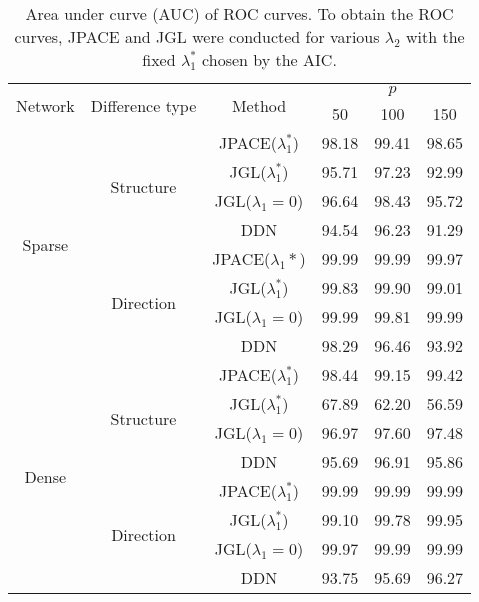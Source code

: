 \documentclass[useAMS,usenatbib,referee]{bio}
\begin{document}
{{\begin{table}[htb!]
\caption{Area under curve (AUC) of ROC curves.
To obtain the ROC curves, JPACE and JGL were conducted for various $\lambda_2$ with the fixed $\lambda_1^*$ chosen by the AIC.}
\medskip
\centering
{\footnotesize
\begin{tabular}{|c|c|c|c|c|c|} \cline{1-6}
\multirow{2}{*}{Network}	&	\multirow{2}{*}{Difference type}	&	\multirow{2}{*}{Method}	&	\multicolumn{3}{|c|}{$p$}					\\	\cline{4-6}
	&		&		&	50	&	100	&	150	\\	\hline
\multirow{8}{*}{Sparse}	&	\multirow{4}{*}{Structure}	&	JPACE($\lambda_1^*$)	&	98.18	&	99.41	&	98.65	\\	
	&		&	JGL($\lambda_1^*$)	&	95.71	&	97.23	&	92.99	\\	
	&		&	JGL($\lambda_1=0$)	&	96.64	&	98.43	&	95.72	\\	
	&		&	DDN	&	94.54	&	96.23	&	91.29	\\	\cline{2-6}
	&	\multirow{4}{*}{Direction}	&	JPACE($\lambda_1*$)	&	99.99	&	99.99	&	99.97	\\	
	&		&	JGL($\lambda_1^*$)	&	99.83	&	99.90	&	99.01	\\	
	&		&	JGL($\lambda_1=0$)	&	99.99	&	99.81	&	99.99	\\	
	&		&	DDN	&	98.29	&	96.46	&	93.92	\\	\hline
\multirow{8}{*}{Dense}	&	\multirow{4}{*}{Structure}	&	JPACE($\lambda_1^*$)	&	98.44	&	99.15	&	99.42	\\	
	&		&	JGL($\lambda_1^*$)	&	67.89	&	62.20	&	56.59	\\	
	&		&	JGL($\lambda_1=0$)	&	96.97	&	97.60	&	97.48	\\	
	&		&	DDN	&	95.69	&	96.91	&	95.86	\\	\cline{2-6}
	&	\multirow{4}{*}{Direction}	&	JPACE($\lambda_1^*$)	&	99.99	&	99.99	&	99.99	\\	
	&		&	JGL($\lambda_1^*$)	&	99.10	&	99.78	&	99.95	\\	
	&		&	JGL($\lambda_1=0$)	&	99.97	&	99.99	&	99.99	\\	
	&		&	DDN	&	93.75	&	95.69	&	96.27	\\	\hline

\end{tabular}
}
\end{table}


}}
\end{document}
